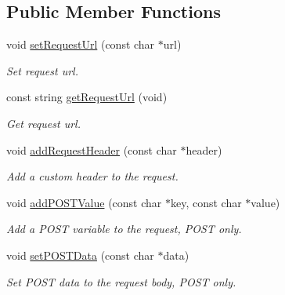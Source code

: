 \subsection*{Public Member Functions}
\begin{DoxyCompactItemize}
\item 
\mbox{\label{classHTTPRequest_ae90d5d1c70b5f9df46208ae34fc12e80}} 
void \hyperlink{classHTTPRequest_ae90d5d1c70b5f9df46208ae34fc12e80}{set\+Request\+Url} (const char $\ast$url)
\begin{DoxyCompactList}\small\item\em Set request url. \end{DoxyCompactList}\item 
\mbox{\label{classHTTPRequest_ae96c279487c9f38a868694e517f0e929}} 
const string \hyperlink{classHTTPRequest_ae96c279487c9f38a868694e517f0e929}{get\+Request\+Url} (void)
\begin{DoxyCompactList}\small\item\em Get request url. \end{DoxyCompactList}\item 
\mbox{\label{classHTTPRequest_af36065c9de6520eef7bc9e79d7333aac}} 
void \hyperlink{classHTTPRequest_af36065c9de6520eef7bc9e79d7333aac}{add\+Request\+Header} (const char $\ast$header)
\begin{DoxyCompactList}\small\item\em Add a custom header to the request. \end{DoxyCompactList}\item 
\mbox{\label{classHTTPRequest_a82bab4dd8ddfeb8caf3f2addb0876b7b}} 
void \hyperlink{classHTTPRequest_a82bab4dd8ddfeb8caf3f2addb0876b7b}{add\+P\+O\+S\+T\+Value} (const char $\ast$key, const char $\ast$value)
\begin{DoxyCompactList}\small\item\em Add a P\+O\+ST variable to the request, P\+O\+ST only. \end{DoxyCompactList}\item 
\mbox{\label{classHTTPRequest_ac570006c5db87ccee64885f15df3661f}} 
void \hyperlink{classHTTPRequest_ac570006c5db87ccee64885f15df3661f}{set\+P\+O\+S\+T\+Data} (const char $\ast$data)
\begin{DoxyCompactList}\small\item\em Set P\+O\+ST data to the request body, P\+O\+ST only. \end{DoxyCompactList}\item 

\end{DoxyCompactItemize}
